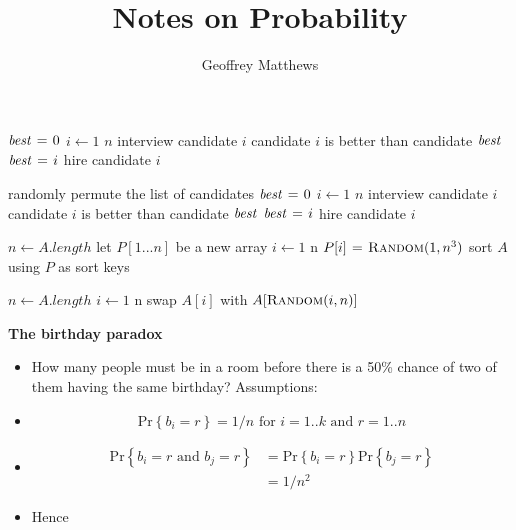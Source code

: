 \documentclass[landscape]{article}
\title{Notes on Probability}
\author{Geoffrey Matthews}
\newcommand{\bi}{\begin{itemize}}
\newcommand{\ei}{\end{itemize}}
\newcommand{\pr}[1]{\ensuremath{\mbox{Pr}\left\{#1\right\}}}
\begin{document}
\maketitle
\titlepage
\huge



\begin{codebox}
  \li $\id{best}\gets 0$
  \li \For $i\gets 1$ \To $n$ \Do
  \li interview candidate $i$
  \li \If candidate $i$ is better than candidate $\id{best}$ \Do
  \li $\id{best} \gets i$
  \li hire candidate $i$
\End
\End
\end{codebox}

\vfill

\begin{codebox}
  \li randomly permute the list of candidates
  \li $\id{best}\gets 0$
  \li \For $i\gets 1$ \To $n$ \Do
  \li interview candidate $i$
  \li \If candidate $i$ is better than candidate $\id{best}$ \Do
  \li $\id{best} \gets i$
  \li hire candidate $i$
\End
\End
\end{codebox}

\vfill
\newpage

\begin{codebox}
  \li $n \gets A.length$
  \li let $P[1...n]$ be a new array
  \li \For $i\gets 1$ \To n \Do
  \li $P[i] \mathrel{\hspace{1pt}=\hspace{1pt}} \textnormal{\scshape Random}(1,n^3)$
\End
\li sort $A$ using $P$ as sort keys
\end{codebox}

\vfill

\begin{codebox}
  \li $n \gets A.length$
  \li \For $i\gets 1$ \To n \Do
  \li swap $A[i]$ with $A[\textnormal{\scshape Random}(i,n)]$
\End
\end{codebox}
\vfill

\newpage

{\bf The birthday paradox}
\bi
\item
How many people must be in a room before there is a 50\% chance of two
of them having the same birthday? Assumptions:
\item
 \[\pr{b_i = r} = 1/n\mbox{ for }i=1..k\mbox{ and }r=1..n\]
\item
  \begin{align*}
    \pr{b_i=r \mbox{ and } b_j=r} &=
    \pr{b_i=r}\pr{b_j=r}\\ &= 1/n^2
    \end{align*}
\item Hence
  
\ei
\end{document}
